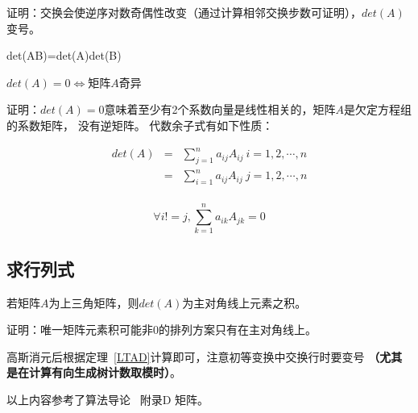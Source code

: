 证明：交换会使逆序对数奇偶性改变（通过计算相邻交换步数可证明），$det(A)$变号。
\begin{property}
	det(AB)=det(A)det(B)
\end{property}
\begin{theorem}
	$det(A)=0\Leftrightarrow$矩阵$A$奇异
\end{theorem}
证明：$det(A)=0$意味着至少有2个系数向量是线性相关的，矩阵$A$是欠定方程组的系数矩阵，
没有逆矩阵。
代数余子式有如下性质：
\begin{property}
    \begin{eqnarray*}
        det(A)&=&\sum_{j=1}^n{a_{ij}A_{ij}} ~i=1,2,\cdots,n\\
        &=&\sum_{i=1}^n{a_{ij}A_{ij}} ~j=1,2,\cdots,n\\
    \end{eqnarray*}
\end{property}
\begin{property}
    \begin{displaymath}
        \forall i!=j,\sum_{k=1}^n{a_{ik}A_{jk}}=0
    \end{displaymath}
\end{property}
\subsection{求行列式}
\begin{theorem}\label{LTAD}
	若矩阵$A$为上三角矩阵，则$det(A)$为主对角线上元素之积。
\end{theorem}
证明：唯一矩阵元素积可能非0的排列方案只有在主对角线上。

高斯消元后根据定理~\ref{LTAD}计算即可，注意初等变换中交换行时要变号
{\bfseries （尤其是在计算有向生成树计数取模时）}。

以上内容参考了算法导论~\cite{ITA3} 附录D 矩阵。
